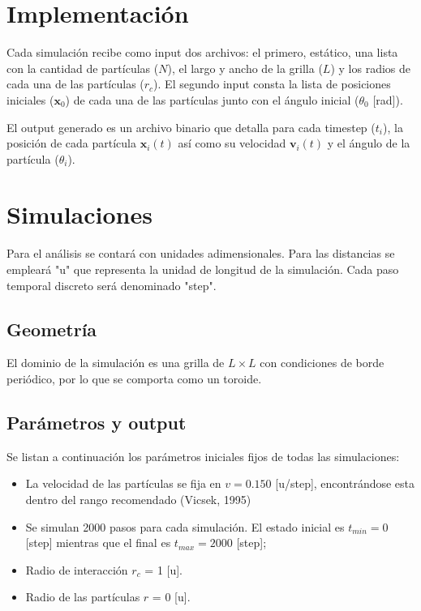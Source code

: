 \documentclass{article}
\begin{document}
\section{Implementación}

Cada simulación recibe como input dos archivos: el primero, estático, una lista con la cantidad de partículas (\( N\)), el largo y ancho de la grilla (\( L\)) y los radios de cada una de las partículas (\( r_c\)). El segundo input consta la lista de posiciones iniciales (\(\mathbf x_0\)) de cada una de las partículas junto con el ángulo inicial (\( \theta_0\) [rad]).

El output generado es un archivo binario que detalla para cada timestep (\(t_i\)), la posición de cada partícula \(\mathbf x_i(t)\) así como su velocidad  \(\mathbf v_i(t)\) y el ángulo de la partícula (\( \theta_i\)).

\section{Simulaciones}

Para el análisis se contará con unidades adimensionales. Para las distancias se empleará "u" que representa la unidad de longitud de la simulación. Cada paso temporal discreto será denominado "step".

\subsection{Geometría}

El dominio de la simulación es una grilla de \(L\times L\) con condiciones de borde periódico, por lo que se comporta como un toroide.

\subsection{Parámetros y output}

Se listan a continuación los parámetros iniciales fijos de todas  las simulaciones:

\begin{itemize}
    \item La velocidad de las partículas se fija en \( v = 0.150 \) [u/step], encontrándose esta dentro del rango recomendado (Vicsek, 1995)
    \item Se simulan 2000 pasos para cada simulación. El estado inicial es  \( t_{min} = 0\) [step] mientras que el final es  \(t_{max} = 2000\) [step];
    \item Radio de interacción \(r_c\) = 1 [u].
    \item Radio de las partículas \(r\) = 0 [u].
\end{itemize}
\end{document}
